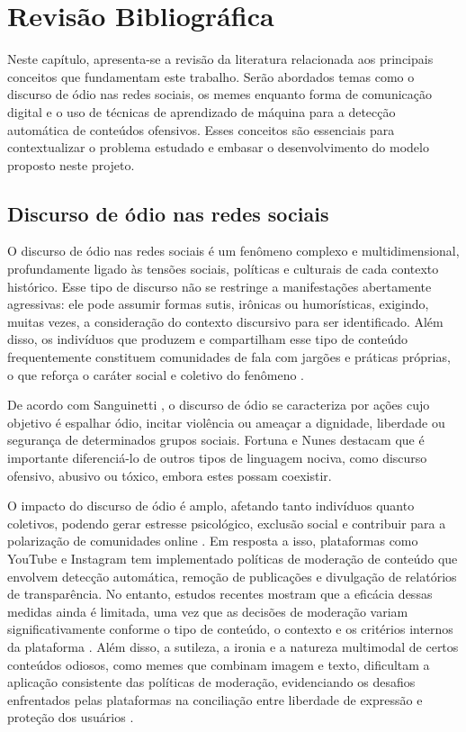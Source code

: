 \chapter{Revisão Bibliográfica}
\label{cap:02}

Neste capítulo, apresenta-se a revisão da literatura relacionada aos principais conceitos que fundamentam este trabalho. Serão abordados temas como o discurso de ódio nas redes sociais, os memes enquanto forma de comunicação digital e o uso de técnicas de aprendizado de máquina para a detecção automática de conteúdos ofensivos. Esses conceitos são essenciais para contextualizar o problema estudado e embasar o desenvolvimento do modelo proposto neste projeto.

\section{Discurso de ódio nas redes sociais}

O discurso de ódio nas redes sociais é um fenômeno complexo e multidimensional, profundamente ligado às tensões sociais, políticas e culturais de cada contexto histórico. Esse tipo de discurso não se restringe a manifestações abertamente agressivas: ele pode assumir formas sutis, irônicas ou humorísticas, exigindo, muitas vezes, a consideração do contexto discursivo para ser identificado. Além disso, os indivíduos que produzem e compartilham esse tipo de conteúdo frequentemente constituem comunidades de fala com jargões e práticas próprias, o que reforça o caráter social e coletivo do fenômeno \cite{Ferrari2022}.

De acordo com Sanguinetti \cite{sanguinetti2018}, o discurso de ódio se caracteriza por ações cujo objetivo é espalhar ódio, incitar violência ou ameaçar a dignidade, liberdade ou segurança de determinados grupos sociais. Fortuna e Nunes \cite{fortuna2018} destacam que é importante diferenciá-lo de outros tipos de linguagem nociva, como discurso ofensivo, abusivo ou tóxico, embora estes possam coexistir.

O impacto do discurso de ódio é amplo, afetando tanto indivíduos quanto coletivos, podendo gerar estresse psicológico, exclusão social e contribuir para a polarização de comunidades online \cite{waseem2017}. Em resposta a isso, plataformas como YouTube e Instagram tem implementado políticas de moderação de conteúdo que envolvem detecção automática, remoção de publicações e divulgação de relatórios de transparência. No entanto, estudos recentes mostram que a eficácia dessas medidas ainda é limitada, uma vez que as decisões de moderação variam significativamente conforme o tipo de conteúdo, o contexto e os critérios internos da plataforma \cite{Dergacheva2023}. Além disso, a sutileza, a ironia e a natureza multimodal de certos conteúdos odiosos, como memes que combinam imagem e texto, dificultam a aplicação consistente das políticas de moderação, evidenciando os desafios enfrentados pelas plataformas na conciliação entre liberdade de expressão e proteção dos usuários \cite{anImage2023}.

